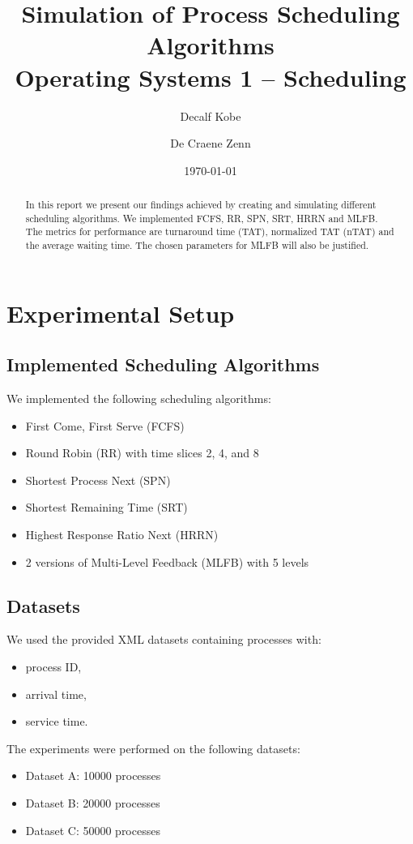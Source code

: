 \documentclass[a4paper,11pt]{article}
\title{\textbf{Simulation of Process Scheduling Algorithms}\\[0.5em]
Operating Systems 1 -- Scheduling}
\author{
    Decalf Kobe \and
    De Craene Zenn
}
\date{\today}
\begin{document}
\maketitle

\vspace{-1em}
\begin{abstract}
In this report we present our findings achieved by creating and simulating different scheduling algorithms. 
We implemented FCFS, RR, SPN, SRT, HRRN and MLFB. The metrics for performance are turnaround time (TAT), normalized TAT (nTAT) and the average waiting time.
The chosen parameters for MLFB will also be justified.
\end{abstract}

\section{Experimental Setup}
\subsection{Implemented Scheduling Algorithms}
We implemented the following scheduling algorithms:
\begin{itemize}[leftmargin=1.5em]
    \item First Come, First Serve (FCFS)
    \item Round Robin (RR) with time slices 2, 4, and 8
    \item Shortest Process Next (SPN)
    \item Shortest Remaining Time (SRT)
    \item Highest Response Ratio Next (HRRN)
    \item 2 versions of Multi-Level Feedback (MLFB) with 5 levels
\end{itemize}

\subsection{Datasets}
We used the provided XML datasets containing processes with:
\begin{itemize}[leftmargin=1.5em]
    \item process ID,
    \item arrival time,
    \item service time.
\end{itemize}

The experiments were performed on the following datasets:
\begin{itemize}[leftmargin=1.5em]
    \item Dataset A: 10000 processes
    \item Dataset B: 20000 processes
    \item Dataset C: 50000 processes
\end{itemize}
\end{document}
